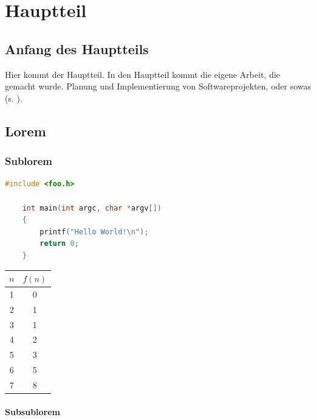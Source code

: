 \chapter{Hauptteil}

\section{Anfang des Hauptteils}

Hier kommt der Hauptteil.
In den Hauptteil kommt die eigene Arbeit, die gemacht wurde.
Planung und Implementierung von Softwareprojekten, oder sowas (s. \cite{knuth84}).

\section{Lorem}

\lipsum[1-3]

\subsection{Sublorem}

\begin{lstlisting}[language=c, style=dhpaperdefault]
    #include <foo.h>

    int main(int argc, char *argv[])
    {
        printf("Hello World!\n");
        return 0;
    }
\end{lstlisting}

\lipsum[2-3]

\begin{table}[h]
    \centering
    \begin{tabular}{c|c}
        $n$ & $f(n)$ \\ \hline
        1   & 0      \\
        2   & 1      \\
        3   & 1      \\
        4   & 2      \\
        5   & 3      \\
        6   & 5      \\
        7   & 8      \\
    \end{tabular}
\end{table}

\subsubsection{Subsublorem}

